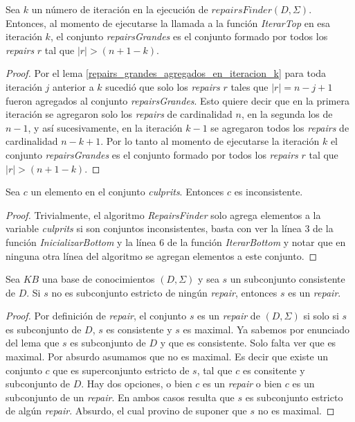 \documentclass[11pt,a4paper,twoside]{tesis}
\begin{document}
\begin{lemma}\label{repairs_grandes_agregados}
Sea $k$ un número de iteración en la ejecución de $repairsFinder(D, \Sigma)$. Entonces, al momento de ejecutarse la llamada a la función \textit{IterarTop} en esa iteración $k$, el conjunto \textit{repairsGrandes} es el conjunto formado por todos los \textit{repairs} $r$ tal que $|r| > (n + 1 - k)$.
\end{lemma}

\begin{proof}
Por el lema \ref{repairs_grandes_agregados_en_iteracion_k} para toda iteración $j$ anterior a $k$ sucedió que solo los \textit{repairs} $r$ tales que $|r| = n - j + 1$ fueron agregados al conjunto \textit{repairsGrandes}. Esto quiere decir que en la primera iteración se agregaron solo los \textit{repairs} de cardinalidad $n$, en la segunda los de $n-1$, y así sucesivamente, en la iteración $k-1$ se agregaron todos los \textit{repairs} de cardinalidad $n-k+1$. Por lo tanto al momento de ejecutarse la iteración $k$ el conjunto \textit{repairsGrandes} es el conjunto formado por todos los \textit{repairs} $r$ tal que $|r| > (n + 1 - k)$.
\end{proof}

\begin{lemma}\label{culprits_inconsistentes}
Sea $c$ un elemento en el conjunto \textit{culprits}. Entonces $c$ es inconsistente.
\end{lemma}

\begin{proof}
Trivialmente, el algoritmo \textit{RepairsFinder} solo agrega elementos a la variable \textit{culprits} si son conjuntos inconsistentes, basta con ver la línea 3 de la función \textit{InicializarBottom} y la línea 6 de la función \textit{IterarBottom} y notar que en ninguna otra línea del algoritmo se agregan elementos a este conjunto.
\end{proof}


\begin{lemma}\label{s_es_un_repair}
Sea $KB$ una base de conocimientos $(D, \Sigma)$ y sea $s$ un subconjunto consistente de $D$. Si $s$ no es subconjunto estricto de ningún \textit{repair}, entonces $s$ es un \textit{repair}.
\end{lemma}

\begin{proof}
Por definición de \textit{repair}, el conjunto $s$ es un \textit{repair} de $(D, \Sigma)$ si solo si $s$ es subconjunto de $D$, $s$ es consistente y $s$ es maximal. Ya sabemos por enunciado del lema que $s$ es subconjunto de $D$ y que es consistente. Solo falta ver que es maximal. Por absurdo asumamos que no es maximal. Es decir que existe un conjunto $c$ que es superconjunto estricto de $s$, tal que $c$ es consitente y subconjunto de $D$. Hay dos opciones, o bien $c$ es un \textit{repair} o bien $c$ es un subconjunto de un \textit{repair}. En ambos casos resulta que $s$ es subconjunto estricto de algún \textit{repair}. Absurdo, el cual provino de suponer que $s$ no es maximal.
\end{proof}
\end{document}
